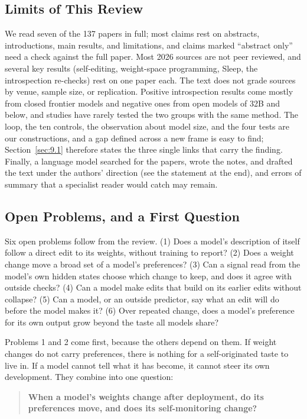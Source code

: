 \documentclass[journal]{IEEEtran}
\begin{document}
\subsection{Limits of This Review}\label{sec:9.3}

We read seven of the 137 papers in full; most claims rest on abstracts, introductions, main results, and limitations, and claims marked ``abstract only'' need a check against the full paper. Most 2026 sources are not peer reviewed, and several key results (self-editing, weight-space programming, Sleep, the introspection re-checks) rest on one paper each. The text does not grade sources by venue, sample size, or replication. Positive introspection results come mostly from closed frontier models and negative ones from open models of 32B and below, and studies have rarely tested the two groups with the same method. The loop, the ten controls, the observation about model size, and the four tests are our constructions, and a gap defined across a new frame is easy to find; Section~\ref{sec:9.1} therefore states the three single links that carry the finding. Finally, a language model searched for the papers, wrote the notes, and drafted the text under the authors' direction (see the statement at the end), and errors of summary that a specialist reader would catch may remain.

\subsection{Open Problems, and a First Question}\label{sec:9.4}

Six open problems follow from the review. (1) Does a model's description of itself follow a direct edit to its weights, without training to report? (2) Does a weight change move a broad set of a model's preferences? (3) Can a signal read from the model's own hidden states choose which change to keep, and does it agree with outside checks? (4) Can a model make edits that build on its earlier edits without collapse? (5) Can a model, or an outside predictor, say what an edit will do before the model makes it? (6) Over repeated change, does a model's preference for its own output grow beyond the taste all models share?

Problems 1 and 2 come first, because the others depend on them. If weight changes do not carry preferences, there is nothing for a self-originated taste to live in. If a model cannot tell what it has become, it cannot steer its own development. They combine into one question:
\begin{quote}
\textbf{When a model's weights change after deployment, do its preferences move, and does its self-monitoring change?}
\end{quote}
\end{document}
